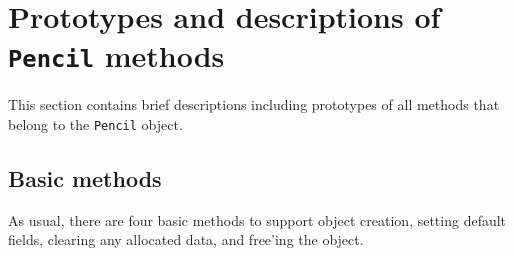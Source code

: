 \par
\section{Prototypes and descriptions of {\tt Pencil} methods}
\label{section:Pencil:proto}
\par
This section contains brief descriptions including prototypes
of all methods that belong to the {\tt Pencil} object.
\par
\subsection{Basic methods}
\label{subsection:Pencil:proto:basics}
\par
As usual, there are four basic methods to support object creation,
setting default fields, clearing any allocated data, and free'ing
the object.
\par
